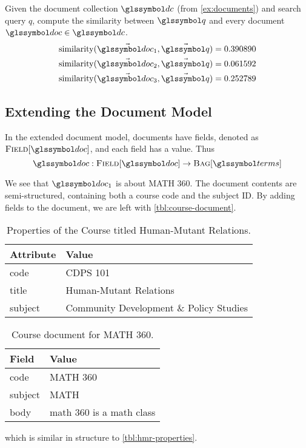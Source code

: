 		\begin{ex}
			Given the document collection \(\dc\) (from \vref{ex:documents}) and search query \(q\), compute the similarity between \(\q\) and every document \(\doc \in \dc\).
			\begin{align}
				\similarity(\vec{\doc_1}, \vec{\q}) = 0.390890 \\
				\similarity(\vec{\doc_2}, \vec{\q}) = 0.061592 \\
				\similarity(\vec{\doc_3}, \vec{\q}) = 0.252789
			\end{align}
		\end{ex}
		
	\subsection{Extending the Document Model}
	\label{sec:extending-the-document-model}
		In the extended document model, documents have fields, denoted as \(\fields{\doc}\), and each field has a value.  Thus
		\[
			\doc : \fields{\doc} \to \bag{\terms}
		\]
		
		\begin{ex}
			We see that \(\doc_1\) is about MATH 360.  The document contents are semi-structured, containing both a course code and the subject ID.  By adding fields to the document, we are left with \vref{tbl:course-document}.
			
			\begin{table}
				\centering
				
				\begin{tabular}{ll}
					\toprule
					Attribute & Value \\
					\midrule
					code & CDPS 101 \\
					title & Human-Mutant Relations \\
					subject & Community Development \& Policy Studies \\
					\bottomrule
				\end{tabular}
				
				\caption{Properties of the Course titled Human-Mutant Relations.}
				\label{tbl:hmr-properties}
			\end{table}
			
			\begin{table}
				\centering
				
				\begin{tabular}{ll}
					\toprule
					Field & Value \\
					\midrule
					code & MATH 360 \\
					subject & MATH \\
					body & math 360 is a math class \\
					\bottomrule
				\end{tabular}
				
				\caption{Course document for MATH 360.}
				\label{tbl:course-document}
			\end{table}
			
			which is similar in structure to \vref{tbl:hmr-properties}.
		\end{ex}
		
